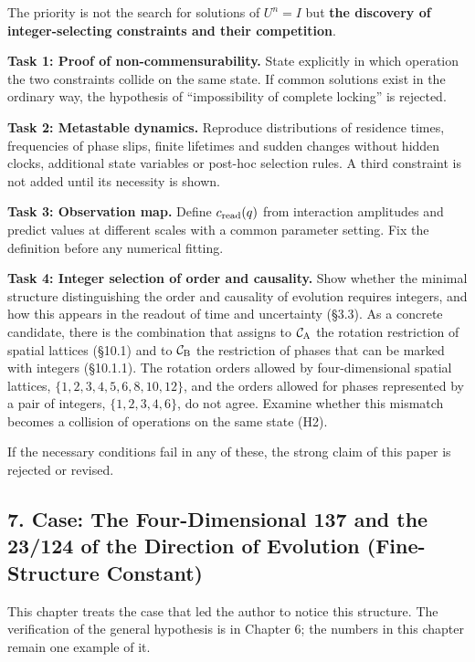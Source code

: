 \documentclass[
  a4paper,
]{article}
\begin{document}
The priority is not the search for solutions of \(U^n=I\) but
\textbf{the discovery of integer-selecting constraints and their
competition}.

\textbf{Task 1: Proof of non-commensurability.} State explicitly in
which operation the two constraints collide on the same state. If common
solutions exist in the ordinary way, the hypothesis of ``impossibility
of complete locking'' is rejected.

\textbf{Task 2: Metastable dynamics.} Reproduce distributions of
residence times, frequencies of phase slips, finite lifetimes and sudden
changes without hidden clocks, additional state variables or post-hoc
selection rules. A third constraint is not added until its necessity is
shown.

\textbf{Task 3: Observation map.} Define \(c_{\rm read}(q)\) from
interaction amplitudes and predict values at different scales with a
common parameter setting. Fix the definition before any numerical
fitting.

\textbf{Task 4: Integer selection of order and causality.} Show whether
the minimal structure distinguishing the order and causality of
evolution requires integers, and how this appears in the readout of time
and uncertainty (§3.3). As a concrete candidate, there is the
combination that assigns to \(\mathcal C_{\rm A}\) the rotation
restriction of spatial lattices (§10.1) and to \(\mathcal C_{\rm B}\)
the restriction of phases that can be marked with integers (§10.1.1).
The rotation orders allowed by four-dimensional spatial lattices,
\(\{1,2,3,4,5,6,8,10,12\}\), and the orders allowed for phases
represented by a pair of integers, \(\{1,2,3,4,6\}\), do not agree.
Examine whether this mismatch becomes a collision of operations on the
same state (H2).

If the necessary conditions fail in any of these, the strong claim of
this paper is rejected or revised.

\subsection{7. Case: The Four-Dimensional 137 and the 23/124 of the
Direction of Evolution (Fine-Structure
Constant)}\label{case-the-four-dimensional-137-and-the-23124-of-the-direction-of-evolution-fine-structure-constant}

This chapter treats the case that led the author to notice this
structure. The verification of the general hypothesis is in Chapter 6;
the numbers in this chapter remain one example of it.
\end{document}
